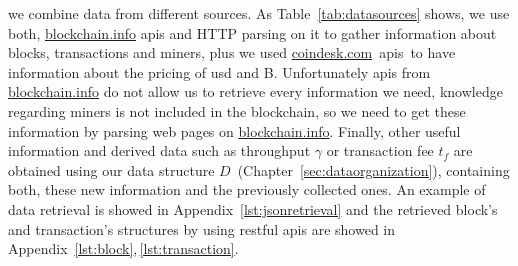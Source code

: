 \documentclass[USenglish]{uit-thesis}
\def\bitcoin{\leavevmode\rlap{\hskip.5pt-}B}
\begin{document}
we combine data from different sources. As Table~\ref{tab:datasources}
shows, we use both, \url{blockchain.info} \gls{api}s and HTTP parsing
on it to gather information about blocks, transactions and miners,
plus we used \url{coindesk.com}~\gls{api}s\,\cite{coindesk, forex-python}
to have information about the pricing of \gls{usd} and \bitcoin.
Unfortunately \gls{api}s from \url{blockchain.info}
do not allow us to
retrieve every information we need,
knowledge regarding miners is
not included in the blockchain, so we
need to get these information by parsing
web pages on \url{blockchain.info}.
Finally, other useful information and derived data
such as throughput $\gamma$ or transaction
fee $t_f$ are obtained using our
data structure $D$~(Chapter~\ref{sec:dataorganization}),
containing both, these new
information and the previously collected ones.
An example of data retrieval is showed in Appendix~\ref{lst:jsonretrieval}
and the retrieved block's and transaction's structures
by using \gls{rest}ful \gls{api}s are
showed in Appendix~\ref{lst:block},\,\ref{lst:transaction}.

\end{document}
